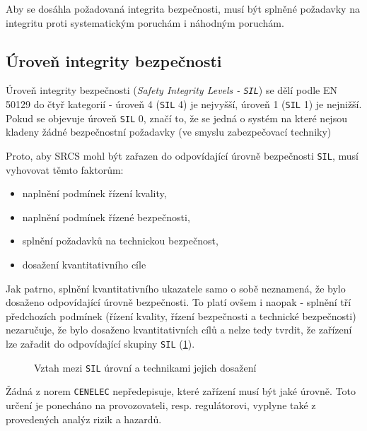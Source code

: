 {    Aby se dosáhla požadovaná integrita bezpečnosti, musí být splněné požadavky na integritu proti 
    systematickým poruchám i náhodným poruchám. 
    
    \subsection{Úroveň integrity bezpečnosti}
      Úroveň integrity bezpečnosti (\emph{Safety Integrity Levels - \texttt{SIL}}) se dělí podle EN 
      50129
      do čtyř kategorií - úroveň 4 (\texttt{SIL} 4) je nejvyšší, úroveň 1 (\texttt{SIL} 1) je 
      nejnižší.  Pokud se
      objevuje úroveň \texttt{SIL} 0, značí to, že se jedná o systém na které nejsou kladeny žádné
      bezpečnostní požadavky (ve smyslu zabezpečovací techniky)
      
      Proto, aby SRCS mohl být zařazen do odpovídající úrovně bezpečnosti \texttt{SIL}, musí 
      vyhovovat
      těmto faktorům:
      \begin{itemize}
        \item naplnění podmínek řízení kvality, 
        \item naplnění podmínek řízené bezpečnosti,
        \item splnění požadavků na technickou bezpečnost, 
        \item dosažení kvantitativního cíle
      \end{itemize}
      
      Jak patrno, splnění kvantitativního ukazatele samo o sobě neznamená, že bylo dosaženo
      odpovídající úrovně bezpečnosti. To platí ovšem i naopak - splnění tří předchozích podmínek
      (řízení kvality, řízení bezpečnosti a technické bezpečnosti) nezaručuje, že bylo dosaženo
      kvantitativních cílů a nelze tedy tvrdit, že zařízení lze zařadit do odpovídající skupiny
      \texttt{SIL} (\ref{DZT:fig_EN50129_SIL_techniques}).
      
      \begin{figure}[ht!]%
        \centering
        \caption{Vztah mezi \texttt{SIL} úrovní a technikami jejich dosažení}
        \label{DZT:fig_EN50129_SIL_techniques}
      \end{figure}
      
      Žádná z norem \texttt{CENELEC} nepředepisuje, které zařízení musí být jaké úrovně. Toto 
      určení je 
      ponecháno na provozovateli, resp. regulátorovi, vyplyne také z provedených analýz rizik 
      a hazardů.
      
}
